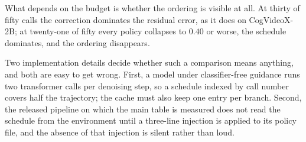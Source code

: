 What depends on the budget is whether the ordering is visible at all. At thirty of fifty calls the
correction dominates the residual error, as it does on CogVideoX-2B; at twenty-one of fifty every
policy collapses to $0.40$ or worse, the schedule dominates, and the ordering disappears.

Two implementation details decide whether such a comparison means anything, and both are easy to
get wrong. First, a model under classifier-free guidance runs two transformer calls per denoising
step, so a schedule indexed by call number covers half the trajectory; the cache must also keep one
entry per branch. Second, the released pipeline on which the main table is measured does not read
the schedule from the environment until a three-line injection is applied to its policy file, and
the absence of that injection is silent rather than loud.
